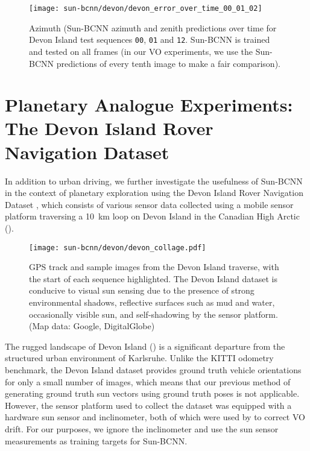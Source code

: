 \begin{figure}
    \centering
    \texttt{[image: sun-bcnn/devon/devon\_error\_over\_time\_00\_01\_02]}
    \caption{Azimuth (Sun-BCNN azimuth and zenith predictions over time for Devon Island test sequences \texttt{00}, \texttt{01} and \texttt{12}. Sun-BCNN is trained and tested on all frames (in our VO experiments, we use the Sun-BCNN predictions of every tenth image to make a fair comparison). }
    \label{fig:sun-bcnn_devon_error_over_time}
\end{figure}

\section{Planetary Analogue Experiments: The Devon Island Rover Navigation Dataset}
In addition to urban driving, we further investigate the usefulness of Sun-BCNN in the context of planetary exploration using the Devon Island Rover Navigation Dataset \citep{Furgale2012-kk}, which consists of various sensor data collected using a mobile sensor platform traversing a 10~km loop on Devon Island in the Canadian High Arctic ().

\begin{figure*}[ht!]
	\centering
	\texttt{[image: sun-bcnn/devon/devon\_collage.pdf]}	
	\caption{GPS track and sample images from the Devon Island traverse, with the start of each sequence highlighted. The Devon Island dataset is conducive to visual sun sensing due to the presence of strong environmental shadows, reflective surfaces such as mud and water, occasionally visible sun, and self-shadowing by the sensor platform. (Map data: Google, DigitalGlobe)}
	\label{fig:devon_collage}
\end{figure*}

The rugged landscape of Devon Island () is a significant departure from the structured urban environment of Karlsruhe.
Unlike the KITTI odometry benchmark, the Devon Island dataset provides ground truth vehicle orientations for only a small number of images, which means that our previous method of generating ground truth sun vectors using ground truth poses is not applicable.
However, the sensor platform used to collect the dataset was equipped with a hardware sun sensor and inclinometer, both of which were used by \citet{Lambert2012-sn} to correct VO drift.
For our purposes, we ignore the inclinometer and use the sun sensor measurements as training targets for Sun-BCNN.

